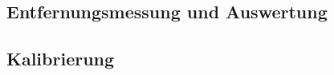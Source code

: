 \begin{comment}
------------------------------------------------------------------------------------------
- Theorie: Ranging (Verfahren)
	- \cite{decawave2015twr}

- Versuchsaufbau
- Mit welchen Einstellungen kommt man auf die Entfernungsmessung?
- Streuung?
- LOS/NLOS {Holz, Bücher, Menschlicher Körper}
	- Welcher Fehler ergibt zwischen LOS/NLOS?
- Wie verändert sich die Genauigkeit der Entfernungsmessung bei einer direkten Sichtverbindung (engl. Line--of--sight (LOS)) und indirekten Sichtverbindung (engl. Non--line--of--sight (NLOS))?
- Der Überblick und Vergleich der verschiedenen Abstandsbestimmungsverfahren erfolgt über eine klassische Literatursuche, siehe \cite{lee2007comparative, herranz2010studying, zekavat2011handbook}.
- isaacs2009optimal - Optimal sensor placement for time difference of arrival localization
- Diagramme
	- \cite{kurth2003experimental}
		- Fig. 2: Sample PDFs showing the true ranges associated with 20, 30, and 50 ft measured ranges. (X: true range, Y:count)
		- Fig. 3: The mean true distances to RF tags vs. measured distances (X:measured range, Y: true range)
		- Fig. 4: The variance in true distances to RF tags vs. measured distances (X:measured range (ft), Y: variance (ft^2))
	
\end{comment}
\subsection{Entfernungsmessung und Auswertung}


\begin{comment}
------------------------------------------------------------------------------------------
- Kalibierung nach DecaWave
	- FlowCharts erklären
	- Ergebnisse auswerten
- Wo liegen die Probleme
- Script im Anhang
- Kalibierungsalgorithmus nach decaWave
	- Hab ich den Überhaupt richtig implementiert?
- Kalibierung über die Anpassung der einer Antennen Delay für alle.
- Kann über die Kalibrierung der Antennenverzögerung eine genauere Entfernungsmessung erreicht werden?
- Das Verfahren zur Kalibrierung der Antennenverzögerung kann ebenfalls der Hersteller--Dokumentation entnommen werden, siehe \cite{decawave2014calibration}. Hierfür muss ein Versuchsaufbau erstellt werden. Zusätzlich wird eine Anpassung der Steuer--/Auswerte-Software notwendig, um die Verzögerung zu berechnen.
- Die Genauigkeitsbestimmung der Entfernungsmessung mit LOS und NLOS wird über einen Versuchsaufbau realisiert. Hierfür werden mehrere Messreihen in verschiedenen Abständen aufgenommen und mit der tatsächlichen Entfernung verglichen.
\end{comment}
\subsection{Kalibrierung}

